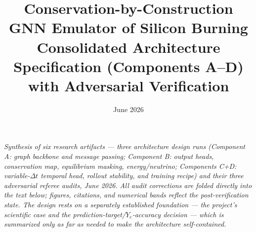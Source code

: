 \documentclass[11pt]{article}
\title{Conservation-by-Construction GNN Emulator of Silicon Burning\\[4pt]
\large Consolidated Architecture Specification (Components A--D) with Adversarial Verification}
\author{}
\date{June 2026}
\newcommand{\Ye}{Y_{e}}
\begin{document}
\maketitle

{\small\itshape
Synthesis of six research artifacts --- three architecture design runs (Component A: graph backbone and message passing; Component B: output heads, conservation map, equilibrium masking, energy/neutrino; Components C+D: variable-$\Delta t$ temporal head, rollout stability, and training recipe) and their three adversarial referee audits, June 2026. All audit corrections are folded directly into the text below; figures, citations, and numerical bands reflect the post-verification state. The design rests on a separately established foundation --- the project's scientific case and the prediction-target/$\Ye$-accuracy decision --- which is summarized only as far as needed to make the architecture self-contained.\par}
\end{document}
